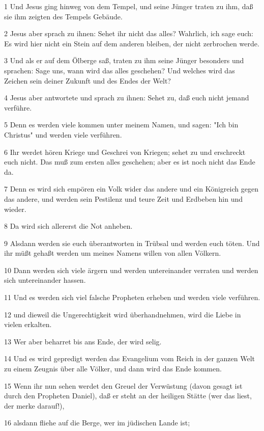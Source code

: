 \par 1 Und Jesus ging hinweg von dem Tempel, und seine Jünger traten zu ihm, daß sie ihm zeigten des Tempels Gebäude.
\par 2 Jesus aber sprach zu ihnen: Sehet ihr nicht das alles? Wahrlich, ich sage euch: Es wird hier nicht ein Stein auf dem anderen bleiben, der nicht zerbrochen werde.
\par 3 Und als er auf dem Ölberge saß, traten zu ihm seine Jünger besonders und sprachen: Sage uns, wann wird das alles geschehen? Und welches wird das Zeichen sein deiner Zukunft und des Endes der Welt?
\par 4 Jesus aber antwortete und sprach zu ihnen: Sehet zu, daß euch nicht jemand verführe.
\par 5 Denn es werden viele kommen unter meinem Namen, und sagen: "Ich bin Christus" und werden viele verführen.
\par 6 Ihr werdet hören Kriege und Geschrei von Kriegen; sehet zu und erschreckt euch nicht. Das muß zum ersten alles geschehen; aber es ist noch nicht das Ende da.
\par 7 Denn es wird sich empören ein Volk wider das andere und ein Königreich gegen das andere, und werden sein Pestilenz und teure Zeit und Erdbeben hin und wieder.
\par 8 Da wird sich allererst die Not anheben.
\par 9 Alsdann werden sie euch überantworten in Trübsal und werden euch töten. Und ihr müßt gehaßt werden um meines Namens willen von allen Völkern.
\par 10 Dann werden sich viele ärgern und werden untereinander verraten und werden sich untereinander hassen.
\par 11 Und es werden sich viel falsche Propheten erheben und werden viele verführen.
\par 12 und dieweil die Ungerechtigkeit wird überhandnehmen, wird die Liebe in vielen erkalten.
\par 13 Wer aber beharret bis ans Ende, der wird selig.
\par 14 Und es wird gepredigt werden das Evangelium vom Reich in der ganzen Welt zu einem Zeugnis über alle Völker, und dann wird das Ende kommen.
\par 15 Wenn ihr nun sehen werdet den Greuel der Verwüstung (davon gesagt ist durch den Propheten Daniel), daß er steht an der heiligen Stätte (wer das liest, der merke darauf!),
\par 16 alsdann fliehe auf die Berge, wer im jüdischen Lande ist;
